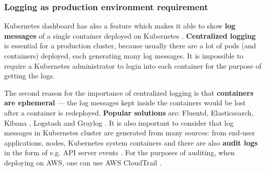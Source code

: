 \subsubsection{Logging as production environment requirement}
Kubernetes dashboard has also a feature which makes it able to show \textbf{log messages} of a single container deployed on Kubernetes \cite{book-mastering-k8s}. \textbf{Centralized logging} is essential for a production cluster, because usually there are a lot of pods (and containers) deployed, each generating many log messages. It is impossible to require a Kubernetes administrator to login into each container for the purpose of getting the logs.

The second reason for the importance of centralized logging is that \textbf{containers are ephemeral} --- the log messages kept inside the containers would be lost after a container is redeployed. \textbf{Popular solutions} are: Fluentd, Elasticsearch, Kibana \cite{book-mastering-k8s}, Logstash \cite{book-devops-k8s} and Graylog \cite{online-prod-year-k8s,online-graylog}. It is also important to consider that log messages in Kubernetes cluster are generated from many sources: from end-user applications, nodes, Kubernetes system containers and there are also \textbf{audit logs} in the form of e.g. API server events \cite{online-graylog-art}. For the purposes of auditing, when deploying on AWS, one can use AWS CloudTrail \cite{online-ct}.

